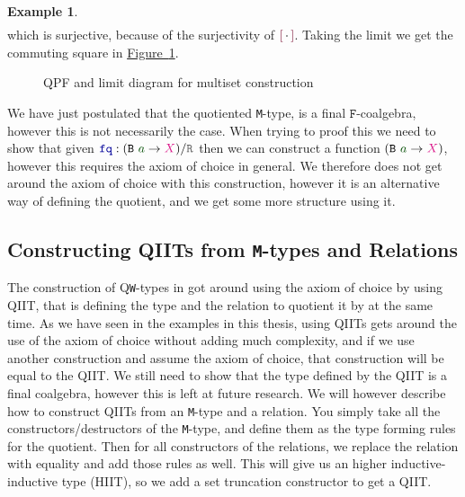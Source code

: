 \documentclass[twoside,11pt,openright]{report}
\theoremstyle{plain} %
\theoremstyle{definition}
\newtheorem{exmp}{Example} %
\theoremstyle{remark}
\newcommand*{\figref}[1]{\hyperref[fig:#1]{Figure~\ref*{fig:#1}}}
\newcommand*{\term}[1]{\textcolor{green!30!black}{#1}} %
\newcommand*{\type}[1]{\textcolor{magenta!90!black}{#1}}
\newcommand*{\relation}[1]{\textcolor{gray!75!black}{\ensuremath{\mathtt{#1}}}}
\newcommand*{\function}[1]{\textcolor{blue!60!black}{\ensuremath{\mathtt{#1}}}}
\newcommand*{\constructor}[1]{\textcolor{purple!60!black}{\ensuremath{\mathtt{#1}}}}
\newcommand*{\typeformer}[1]{\ensuremath{\mathtt{#1}}}
\newcommand*{\functor}[1]{\ensuremath{\mathbf{\mathtt{#1}}}}
\newcommand*{\quotientconstructor}[1]{\constructor{[}\,#1\,\constructor{]}}
\begin{document}
\begin{exmp}
\begin{equation}
\begin{aligned}
    \end{aligned}
  \end{equation}
  which is surjective, because of the surjectivity of \(\quotientconstructor{{\cdot}}\). Taking the limit we get the commuting square in \figref{QPF-limit-multiset}.
  \begin{figure}[h]
  \centering
  \caption{QPF and limit diagram for multiset construction}
  \label{fig:QPF-limit-multiset}
\end{figure}
\end{exmp}
\noindent We have just postulated that the quotiented \texttt{M}-type, is a final \(\functor{F}\)-coalgebra, however this is not necessarily the case. When trying to proof this we need to show that given \(\function{fq} : (\typeformer{B}~\term{a} \rightarrow \type{X}) / \relation{R}\) then we can construct a function \((\typeformer{B}~\term{a} \rightarrow \type{X})\), however this requires the axiom of choice in general. We therefore does not get around the axiom of choice with this construction, however it is an alternative way of defining the quotient, and we get some more structure using it.

\subsection{Constructing QIITs from \texttt{M}-types and Relations}
The construction of Q\texttt{W}-types in \cite{DBLP:Constructing-QIITs} got around using the axiom of choice by using QIIT, that is defining the type and the relation to quotient it by at the same time. As we have seen in the examples in this thesis, using QIITs gets around the use of the axiom of choice without adding much complexity, and if we use another construction and assume the axiom of choice, that construction will be equal to the QIIT. We still need to show that the type defined by the QIIT is a final coalgebra, however this is left at future research. We will however describe how to construct QIITs from an \texttt{M}-type and a relation. You simply take all the constructors/destructors of the \texttt{M}-type, and define them as the type forming rules for the quotient. Then for all constructors of the relations, we replace the relation with equality and add those rules as well. This will give us an higher inductive-inductive type (HIIT), so we add a set truncation constructor to get a QIIT. 
\end{document}
